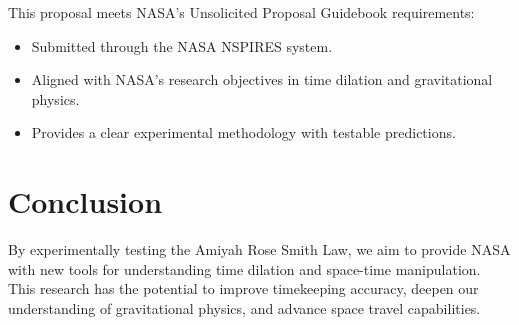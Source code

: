 \documentclass[12pt]{article}
\begin{document}
This proposal meets NASA’s Unsolicited Proposal Guidebook requirements:

\begin{itemize}
    \item Submitted through the NASA NSPIRES system.
    \item Aligned with NASA’s research objectives in time dilation and gravitational physics.
    \item Provides a clear experimental methodology with testable predictions.
\end{itemize}

\section{Conclusion}

By experimentally testing the Amiyah Rose Smith Law, we aim to provide NASA with new tools for understanding time dilation and space-time manipulation. This research has the potential to improve timekeeping accuracy, deepen our understanding of gravitational physics, and advance space travel capabilities.
\end{document}
